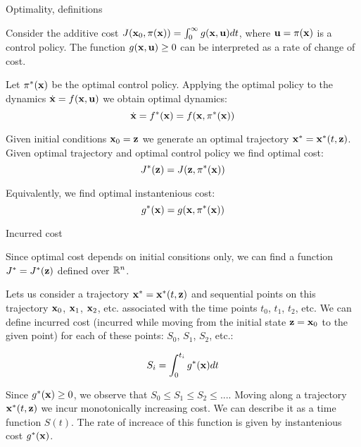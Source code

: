 \documentclass{beamer}
\begin{document}
\begin{frame}{Optimality, definitions}
	\begin{flushleft}
		
		Consider the additive cost $J (\mathbf{x}_0, \pi (\mathbf{x})) = \int_0^\infty g(\mathbf{x}, \mathbf{u}) dt$, where $\mathbf{u} = \pi (\mathbf{x})$ is a control policy. The function $g(\mathbf{x}, \mathbf{u}) \geq 0$ can be interpreted as a rate of change of cost.
		
		\bigskip
		
		Let $\pi^*(\mathbf{x})$ be the optimal control policy. Applying the optimal policy to the dynamics $\dot{\mathbf{x}} = f(\mathbf{x}, \mathbf{u})$ we obtain optimal dynamics:
		\begin{equation}
			\dot{\mathbf{x}} = f^*(\mathbf{x}) = f(\mathbf{x}, \pi^*(\mathbf{x}))
		\end{equation}
		
		Given initial conditions $\mathbf{x}_0 = \mathbf{z}$ we generate an optimal trajectory $\mathbf{x}^* = \mathbf{x}^*(t, \mathbf{z})$. Given optimal trajectory and optimal control policy we find optimal cost:
		\begin{equation}
			J^*(\mathbf{z}) = J(\mathbf{z}, \pi^* (\mathbf{x}))
		\end{equation}
		
		Equivalently, we find optimal instantenious cost:
		\begin{equation}
			g^*(\mathbf{x}) = g(\mathbf{x}, \pi^* (\mathbf{x}))
		\end{equation}
		
		
	\end{flushleft}
\end{frame}



\begin{frame}{Incurred cost}
	\begin{flushleft}
		
		Since optimal cost depends on initial consitions only, we can find a function $J^* = J^*(\mathbf{z})$ defined over $\mathbb{R}^n$.
		
		\bigskip
		
		Lets us consider a trajectory $\mathbf{x}^* = \mathbf{x}^*(t, \mathbf{z})$ and sequential points on this trajectory $\mathbf{x}_0$, $\mathbf{x}_1$, $\mathbf{x}_2$, etc. associated with the time points $t_0$, $t_1$, $t_2$, etc. We can define incurred cost (incurred while moving from the initial state $\mathbf{z} = \mathbf{x}_0$ to the given point) for each of these points: $S_0$, $S_1$, $S_2$, etc.:
		
		\begin{equation}
			S_i = \int_0^{t_i} g^*(\mathbf{x}) dt
		\end{equation}
		
		Since $g^*(\mathbf{x}) \geq 0$, we observe that $S_0 \leq S_1 \leq S_2 \leq ...$. Moving along a trajectory $\mathbf{x}^*(t, \mathbf{z})$ we incur monotonically increasing cost. We can describe it as a time function $S(t)$. The rate of increace of this function is given by instantenious cost $g^*(\mathbf{x})$.
		
		
	\end{flushleft}
\end{frame}
\end{document}
